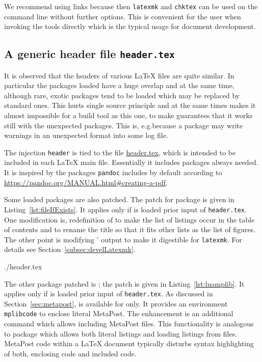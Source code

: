 We recommend using links because then \texttt{latexmk} and \texttt{chktex} 
can be used on the command line without further options. 
This is convenient for the user when invoking the tools directly 
which is the typical usage for document development. 


\subsection{A generic header file \texttt{header.tex}}\label{subsec:header}

It is observed that the headers of various \LaTeX{} files are quite similar. 
In particular the packages loaded 
have a huge overlap and at the same time, although rare, 
exotic packages tend to be loaded which may be replaced by standard ones. 
This hurts single source principle 
and at the same times makes it almost impossible 
for a build tool as this one, 
to make guarantees that it works still with the unexpected packages. 
This is, e.g.\@ because a package may write warnings 
in an unexpected format into some log file. 

The injection \texttt{header} 
is tied to the file \href{\urlSite fromTex/header.tex}{header.tex}, 
which is intended to be included in each \LaTeX{} main file. 
Essentially it includes packages always needed. 
It is inspired by the packages \texttt{pandoc} includes by default 
according to \url{https://pandoc.org/MANUAL.html#creating-a-pdf}. 

Some loaded packages are also patched. 
The patch for package  is given in Listing~\ref{lst:fileIfExists}. 
It applies only if  is loaded prior input of \texttt{header.tex}. 
One modification is, redefinition of  
to make the list of listings occur in the table of contents 
and to rename the title so that it fits other lists as the list of figures.  
The other point is modifying ' output to make it digestible for \texttt{latexmk}. 
For details see Section~\ref{subsec:develLatexmk}. 

%
{./header.tex}%


The other package patched is ; the patch is given in Listing~\ref{lst:luamplib}. 
It applies only if  is loaded prior input of \texttt{header.tex}. 
As discussed in Section~\ref{sec:metapost}, 
 is available for \lualatex{} only. 
It provides an environment \texttt{mplibcode} to enclose literal MetaPost. 
The enhancement is an additional command  
which allows including MetaPost files. 
This functionality is analogous to package  
which allows both literal listings and loading listings from files. 
MetaPost code within a \LaTeX{} document typically disturbs syntax highlighting 
of both, enclosing code and included code. 

